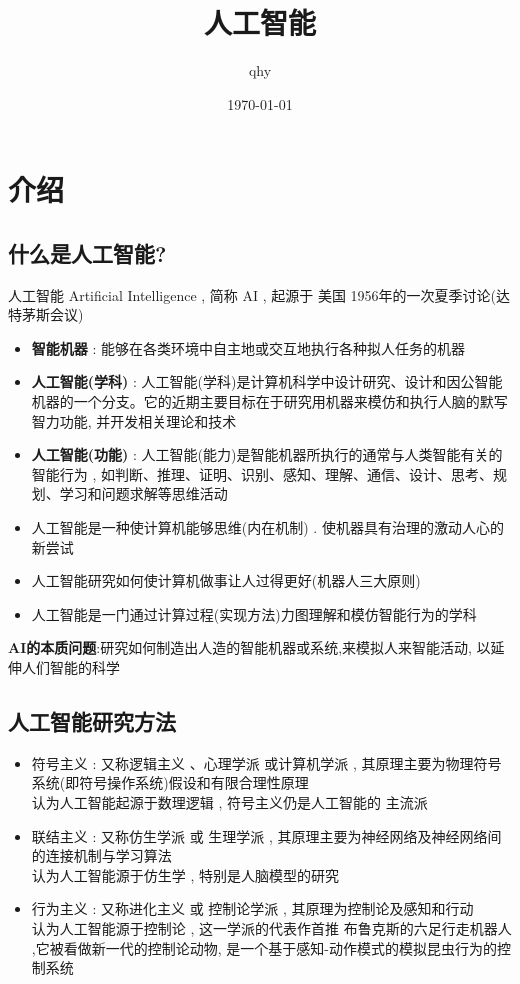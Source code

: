 \documentclass[UTF8,a4paper]{ctexart}
\author{ qhy }
\date{\today}
\title{人工智能}
\begin{document}
\maketitle
\tableofcontents
\newpage

\section{介绍}

\subsection{什么是人工智能?}
人工智能 Artificial Intelligence , 简称 AI , 起源于 美国 1956年的一次夏季讨论(达特茅斯会议)

\begin{itemize}
	\item \textbf{智能机器} : 能够在各类环境中自主地或交互地执行各种拟人任务的机器
	\item \textbf{人工智能(学科)} : 人工智能(学科)是计算机科学中设计研究、设计和因公智能机器的一个分支。它的近期主要目标在于研究用机器来模仿和执行人脑的默写智力功能, 并开发相关理论和技术
	\item \textbf{人工智能(功能)} : 人工智能(能力)是智能机器所执行的通常与人类智能有关的智能行为 , 如判断、推理、证明、识别、感知、理解、通信、设计、思考、规划、学习和问题求解等思维活动
	\item 人工智能是一种使计算机能够思维(内在机制) . 使机器具有治理的激动人心的新尝试
	\item 人工智能研究如何使计算机做事让人过得更好(机器人三大原则)
	\item 人工智能是一门通过计算过程(实现方法)力图理解和模仿智能行为的学科
\end{itemize}

\textbf{AI的本质问题}:研究如何制造出人造的智能机器或系统,来模拟人来智能活动, 以延伸人们智能的科学

\subsection{人工智能研究方法}

\begin{itemize}
	\item 符号主义 : 又称逻辑主义 、心理学派 或计算机学派 , 其原理主要为物理符号系统(即符号操作系统)假设和有限合理性原理\\
	      认为人工智能起源于数理逻辑 , 符号主义仍是人工智能的 主流派

	\item 联结主义 : 又称仿生学派 或 生理学派 , 其原理主要为神经网络及神经网络间的连接机制与学习算法\\
	      认为人工智能源于仿生学 , 特别是人脑模型的研究
	\item 行为主义 : 又称进化主义 或 控制论学派 , 其原理为控制论及感知和行动\\
	      认为人工智能源于控制论 , 这一学派的代表作首推 布鲁克斯的六足行走机器人 ,它被看做新一代的控制论动物, 是一个基于感知-动作模式的模拟昆虫行为的控制系统
\end{itemize}
\end{document}
